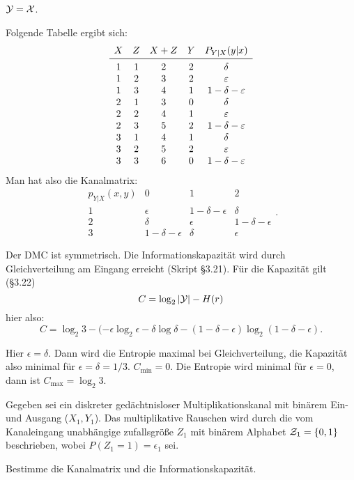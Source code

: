 \documentclass{article}
\begin{document}
\begin{solution}
    \begin{tasks}
        \item $\mathcal{Y}=\mathcal{X}$.
            \item Folgende Tabelle ergibt sich:
        $$
        \begin{matrix}
            X & Z & X+Z & Y & P_{Y|X}(y|x)\\
            \midrule
            1 & 1 & 2 & 2 & \delta\\
            1 & 2 & 3 & 2 & \epsilon\\
            1 & 3 & 4 & 1 & 1-\delta-\epsilon\\
            2 & 1 & 3 & 0 & \delta\\
            2 & 2 & 4 & 1 & \epsilon\\
            2 & 3 & 5 & 2 & 1-\delta-\epsilon\\
            3 & 1 & 4 & 1 & \delta\\
            3 & 2 & 5 & 2 & \epsilon\\
            3 & 3 & 6 & 0 & 1-\delta-\epsilon
        \end{matrix}
        $$
        Man hat also die Kanalmatrix:
        $$
        \begin{matrix}
            p_{Y|X} (x,y) & 0 & 1 & 2\\
            1 & \epsilon & 1-\delta-\epsilon & \delta\\
            2 & \delta & \epsilon & 1-\delta-\epsilon\\
            3 & 1-\delta-\epsilon & \delta & \epsilon
        \end{matrix}.
        $$
            \item Der DMC ist symmetrisch. Die Informationskapazität wird durch Gleichverteilung am Eingang erreicht (Skript §3.21). Für die Kapazität gilt (§3.22)
        $$
        C = \log_2\left|\mathcal{Y}\right| - H(r)
        $$
        hier also:
        $$
        C = \log_2 3 - (-\epsilon\log_2\epsilon-\delta\log\delta-(1-\delta-\epsilon)\log_2(1-\delta-\epsilon).
        $$
        \item Hier $\epsilon=\delta$. Dann wird die Entropie maximal bei Gleichverteilung, die Kapazität also minimal für $\epsilon=\delta=1/3$.
    $C_{\min}=0$. Die Entropie wird minimal für $\epsilon=0$, dann ist $C_{\max}=\log_2 3$.
\end{tasks}
\end{solution}

\begin{exercise}
    Gegeben sei ein diskreter gedächtnisloser Multiplikationskanal mit binärem Ein- und Ausgang ($X_1, Y_1$).
    Das multiplikative Rauschen wird durch die vom Kanaleingang unabhängige zufallsgröße $Z_1$ mit binärem Alphabet $\mathcal{Z}_1=\left\{0,1\right\}$ beschrieben, wobei $P(Z_1=1)=\epsilon_1$ sei.
    \begin{tasks}
        \item Bestimme die Kanalmatrix und die Informationskapazität.
    \end{tasks}
\end{exercise}
\end{document}
